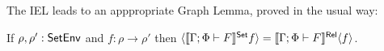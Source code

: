 \documentclass[runningheads]{llncs}
\renewcommand{\id}{\mathit{id}}
\renewcommand{\id}{\mathit{id}}
\begin{document}
The IEL leads to an apppropriate Graph Lemma, proved in the usual way:
\begin{lemma}%
  \label{lem:graph}
  If $\rho, \rho' : \mathsf{SetEnv}$ and $f : \rho \to \rho'$
  then $\langle {\llbracket{\Gamma; \Phi \vdash F}\rrbracket^{\mathsf{Set}}f} \rangle =
\llbracket{\Gamma; \Phi \vdash F}\rrbracket^{\mathsf{Rel}}\langle {f} \rangle$.
\end{lemma}
\begin{comment}
\begin{proof}
Applying Equation~\ref{lem:rel-transf-morph} to the morphisms $(f,
\id_{\rho'}) : \graph{f} \to \Eq_{\rho'}$ and $(\id_{\rho}, f) :
\Eq_{\rho} \to \graph{f}$ of relation environments gives that
$(\setsem{\Gamma; \Phi \vdash F}f, \setsem{\Gamma; \Phi \vdash
  F}\id_{\rho'}) = \relsem{\Gamma; \Phi \vdash F} (f, \id_{\rho'}) :
\relsem{\Gamma; \Phi \vdash F}\graph{f} \to \relsem{\Gamma; \Phi
  \vdash F}\Eq_{\rho'}$ and $(\setsem{\Gamma; \Phi \vdash
  F}\id_{\rho}, \setsem{\Gamma; \Phi \vdash F}f) = \relsem{\Gamma;
  \Phi \vdash F} (\id_{\rho}, f) : \relsem{\Gamma; \Phi \vdash
  F}\Eq_{\rho} \to \relsem{\Gamma; \Phi \vdash F}\graph{f}$.
Expanding the first equation gives that if $(x,y) \in \relsem{\Gamma;
  \Phi \vdash F}\graph{f}$ then $(\setsem{\Gamma; \Phi \vdash F} f\,
x, \setsem{\Gamma; \Phi \vdash F}\id_{\rho'}\, y) \in \relsem{\Gamma;
  \Phi \vdash F}\Eq_{\rho'}$. So $\setsem{\Gamma; \Phi \vdash
  F}\id_{\rho'}\, y = \id_{\setsem{\Gamma; \Phi \vdash F}\rho'}\, y =
y$ and $\relsem{\Gamma; \Phi \vdash F}\Eq_{\rho'} =
\Eq_{\setsem{\Gamma; \Phi \vdash F}\rho'}$, and if $(x,y) \in
\relsem{\Gamma; \Phi \vdash F}\graph{f}$ then $(\setsem{\Gamma; \Phi
  \vdash F} f\, x, y) \in \Eq_{\setsem{\Gamma; \Phi \vdash F}\rho'}$,
i.e., $\setsem{\Gamma; \Phi \vdash F} f\, x = y$, i.e., $(x, y) \in
\graph{\setsem{\Gamma; \Phi \vdash F} f}$.  So, we have that
$\relsem{\Gamma; \Phi \vdash F}\graph{f} \subseteq
\graph{\setsem{\Gamma; \Phi \vdash F}f}$.  Expanding the second
equation gives that if $x \in \setsem{\Gamma; \Phi \vdash F}\rho$ then
$(\setsem{\Gamma; \Phi \vdash F}\id_{\rho}\, x,$\\
$\setsem{\Gamma; \Phi
  \vdash F} f\, x) \in \relsem{\Gamma; \Phi \vdash F}\graph{f}$.  Then
$\setsem{\Gamma; \Phi \vdash F}\id_{\rho}\, x = \id_{\setsem{\Gamma;
    \Phi \vdash F}\rho} x = x$, so for any $x \in \setsem{\Gamma; \Phi
  \vdash F}\rho$ we have that $(x, \setsem{\Gamma; \Phi \vdash F}f\,
x) \in \relsem{\Gamma; \Phi \vdash F}\graph{f}$.  Moreover, $x \in
\setsem{\Gamma; \Phi \vdash F}\rho$ if and only if $(x,
\setsem{\Gamma; \Phi \vdash F} f\, x) \in \graph{\setsem{\Gamma; \Phi
    \vdash F}f}$ and, if $x \in \setsem{\Gamma; \Phi \vdash F}\rho$
then $(x, \setsem{\Gamma; \Phi \vdash F} f\, x) \in \relsem{\Gamma;
  \Phi \vdash F} \graph{f}$, so if $(x, \setsem{\Gamma; \Phi \vdash F}
f\, x) \in \graph{\setsem{\Gamma; \Phi \vdash F}f}$ then $(x,
\setsem{\Gamma; \Phi \vdash F} f\, x) \in \relsem{\Gamma; \Phi \vdash
  F} \graph{f}$, i.e., $\graph{\setsem{\Gamma; \Phi \vdash F}f}
\subseteq \relsem{\Gamma; \Phi \vdash F} \graph{f}$.
\end{proof}
\end{comment}
\end{document}
